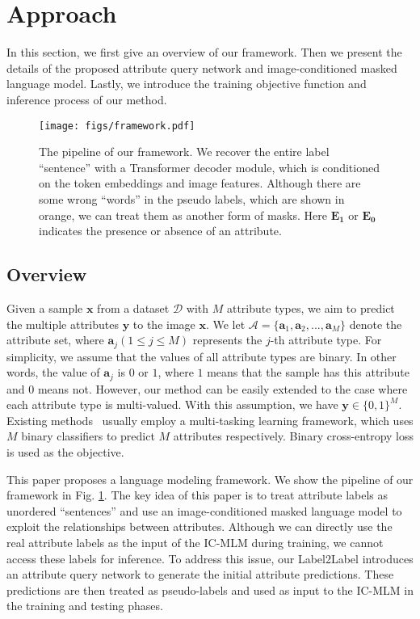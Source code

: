 \documentclass[runningheads]{llncs}
\begin{document}
\section{Approach}
In this section, we first give an overview of our framework. Then we present the details of the proposed attribute query network and image-conditioned masked language model. Lastly, we introduce the training objective function and inference process of our method.


\begin{figure}[t]
  \begin{center}
     \texttt{[image: figs/framework.pdf]}
  \end{center}
     \caption{The pipeline of our framework. 
We recover the entire label ``sentence'' with a Transformer decoder module, which is conditioned on the token embeddings and image features. Although there are some wrong ``words'' in the pseudo labels, which are shown in orange, we can treat them as another form of masks. Here $\bm{E_1}$ or $\bm{E_0}$ indicates the presence or absence of an attribute.}
  \label{fig:flowchart}
  \end{figure}

\subsection{Overview}
Given a sample $\bm{x}$ from a dataset $\mathcal{D}$ with $M$ attribute types, we aim to predict the multiple attributes $\bm{y}$ to the image $\bm{x}$. We let $\mathcal{A} = \{\bm{a}_1,\bm{a}_2, ..., \bm{a}_M\}$ denote the attribute set, where $\bm{a}_j (1 \le j \le M)$ represents the $j$-th attribute type. For simplicity, we assume that the values of all attribute types are binary. In other words, the value of $\bm{a}_j$ is $0$ or $1$, where $1$ means that the sample has this attribute and $0$ means not. However, our method can be easily extended to the case where each attribute type is multi-valued. With this assumption, we have $\bm{y} \in \{0,1\}^M$. Existing methods~\cite{jia2021spatial,cao2018partially} usually employ a multi-tasking learning framework, which uses $M$ binary classifiers to predict $M$ attributes respectively. Binary cross-entropy loss is used as the objective.

This paper proposes a language modeling framework. We show the pipeline of our framework in Fig. \ref{fig:flowchart}. The key idea of this paper is to treat attribute labels as unordered ``sentences'' and use an image-conditioned masked language model to exploit the relationships between attributes. Although we can directly use the real attribute labels as the input of the IC-MLM during training, we cannot access these labels for inference. To address this issue, our Label2Label introduces an attribute query network to generate the initial attribute predictions. These predictions are then treated as pseudo-labels and used as input to the IC-MLM in the training and testing phases.
\end{document}
